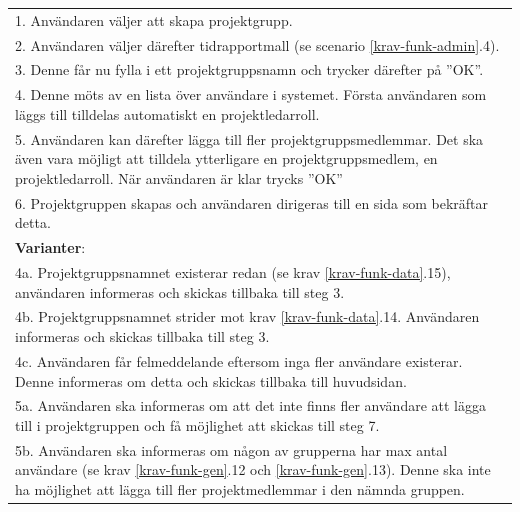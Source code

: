 \documentclass[a4paper]{article}
\begin{document}
\begin{table}[htbp]
\begin{table}[H]
\begin{tabular}{ | p{2cm} p{11cm} | }
	\multicolumn{2}{|p{13cm}|}{1. Användaren väljer att skapa projektgrupp.}\\
	\multicolumn{2}{|p{13cm}|}{2. Användaren väljer därefter tidrapportmall (se scenario \ref{krav-funk-admin}.4).}\\
	\multicolumn{2}{|p{13cm}|}{3. Denne får nu fylla i ett projektgruppsnamn och trycker därefter på ''OK''.} \\	
	\multicolumn{2}{|p{13cm}|}{4. Denne möts av en lista över användare i systemet. Första användaren som läggs till tilldelas automatiskt en projektledarroll.} \\	
	\multicolumn{2}{|p{13cm}|}{5. Användaren kan därefter lägga till fler projektgruppsmedlemmar. Det ska även vara möjligt att tilldela ytterligare en projektgruppsmedlem, en projektledarroll. När användaren är klar trycks ''OK''} \\	
	\multicolumn{2}{|p{13cm}|}{6. Projektgruppen skapas och användaren dirigeras till en sida som bekräftar detta. } \\	
	\hline
    \multicolumn{2}{|p{13cm}|}{\textbf{Varianter}: }\\
    \multicolumn{2}{|p{13cm}|}{4a. Projektgruppsnamnet existerar redan (se krav \ref{krav-funk-data}.15), användaren informeras och skickas tillbaka till steg 3.}\\
    \multicolumn{2}{|p{13cm}|}{4b. Projektgruppsnamnet strider mot krav \ref{krav-funk-data}.14. Användaren informeras och skickas tillbaka till steg 3.}  \\
    \multicolumn{2}{|p{13cm}|}{4c. Användaren får felmeddelande eftersom inga fler användare existerar. Denne informeras om detta och skickas tillbaka till huvudsidan.}\\
       \multicolumn{2}{|p{13cm}|}{5a. Användaren ska informeras om att det inte finns fler användare att lägga till i projektgruppen och få möjlighet att skickas till steg 7.}\\
    \multicolumn{2}{|p{13cm}|}{5b. Användaren ska informeras om någon av grupperna har max antal användare (se krav \ref{krav-funk-gen}.12 och \ref{krav-funk-gen}.13). Denne ska inte ha möjlighet att lägga till fler projektmedlemmar i den nämnda gruppen.}\\

    \hline
\end{tabular}
\end{table}





\end{table}
\end{document}
